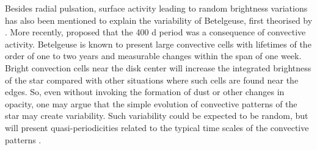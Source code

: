 \documentclass{aa}
\begin{document}
Besides radial pulsation, surface activity leading to random brightness variations has also been mentioned to explain the variability of Betelgeuse, first theorised by \cite{schwarzschild_scale_1975}. More recently, \cite{gray_mass_2008} proposed that the 400 d period was a consequence of convective activity. Betelgeuse is known to present large convective cells with lifetimes of the order of one to two years \citep{lopez_ariste_convective_2018} and measurable changes 
within the span of one week. Bright convection cells near the disk center will increase the integrated brightness of the star compared with other situations where such cells are found near the edges. So, even without invoking the formation of 
dust or other changes in opacity, one may argue that the simple evolution of convective patterns of the star may create variability. Such 
variability could be expected to be random, but will present quasi-periodicities related to the typical time scales of the 
convective patterns \citep{gray_mass_2008}. \\

\end{document}
